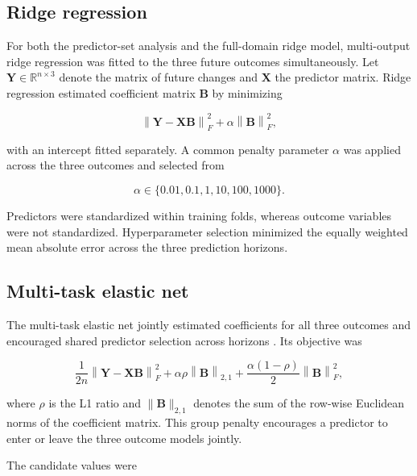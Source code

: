 \documentclass[11pt]{article}
\begin{document}
\subsection{Ridge regression}

For both the predictor-set analysis and the full-domain ridge model, multi-output ridge
regression was fitted to the three future outcomes simultaneously. Let
$\mathbf{Y}\in\mathbb{R}^{n\times 3}$ denote the matrix of future changes and
$\mathbf{X}$ the predictor matrix. Ridge regression estimated coefficient matrix
$\mathbf{B}$ by minimizing

\begin{equation}
\left\|
\mathbf{Y}-\mathbf{X}\mathbf{B}
\right\|_{F}^{2}
+
\alpha
\left\|
\mathbf{B}
\right\|_{F}^{2},
\end{equation}

with an intercept fitted separately. A common penalty parameter $\alpha$ was applied
across the three outcomes and selected from

\begin{equation}
\alpha
\in
\{0.01,0.1,1,10,100,1000\}.
\end{equation}

Predictors were standardized within training folds, whereas outcome variables were not
standardized. Hyperparameter selection minimized the equally weighted mean absolute error
across the three prediction horizons.


\subsection{Multi-task elastic net}

The multi-task elastic net jointly estimated coefficients for all three outcomes and
encouraged shared predictor selection across horizons \citep{zou2005elasticnet}. Its
objective was

\begin{equation}
\frac{1}{2n}
\left\|
\mathbf{Y}-\mathbf{X}\mathbf{B}
\right\|_{F}^{2}
+
\alpha\rho
\left\|
\mathbf{B}
\right\|_{2,1}
+
\frac{\alpha(1-\rho)}{2}
\left\|
\mathbf{B}
\right\|_{F}^{2},
\end{equation}

where $\rho$ is the L1 ratio and
$\|\mathbf{B}\|_{2,1}$ denotes the sum of the row-wise Euclidean norms of the coefficient
matrix. This group penalty encourages a predictor to enter or leave the three outcome
models jointly.

The candidate values were
\end{document}
